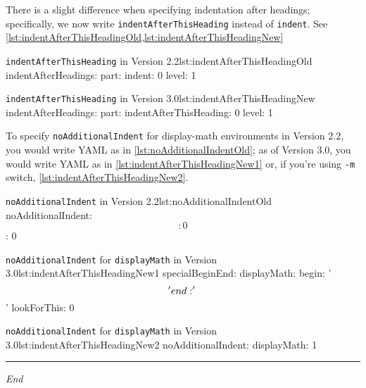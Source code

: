 	 There is a slight difference when specifying indentation after headings; specifically, we now write \texttt{indentAfterThisHeading} instead of \texttt{indent}.
	 See \cref{lst:indentAfterThisHeadingOld,lst:indentAfterThisHeadingNew} 

	 \begin{minipage}{.45\textwidth}
		 \begin{yaml}[style=yaml-LST,numbers=none]{\texttt{indentAfterThisHeading} in Version 2.2}{lst:indentAfterThisHeadingOld}
indentAfterHeadings:
    part:
       indent: 0
       level: 1
\end{yaml}
	 \end{minipage} \hfill
	 \begin{minipage}{.45\textwidth}
		 \begin{yaml}[style=yaml-LST,numbers=none]{\texttt{indentAfterThisHeading} in Version 3.0}{lst:indentAfterThisHeadingNew}
indentAfterHeadings:
    part:
       indentAfterThisHeading: 0
       level: 1
\end{yaml}
	 \end{minipage} 

	 To specify \texttt{noAdditionalIndent} for display-math environments in Version 2.2, you would write YAML as in \cref{lst:noAdditionalIndentOld}; as of Version 3.0, you would write YAML as in \cref{lst:indentAfterThisHeadingNew1} or, if you're using \texttt{-m} switch, \cref{lst:indentAfterThisHeadingNew2}.

	 \begin{minipage}{.45\textwidth}
		 \begin{yaml}[style=yaml-LST,numbers=none]{\texttt{noAdditionalIndent} in Version 2.2}{lst:noAdditionalIndentOld}
noAdditionalIndent:
    \[: 0
    \]: 0
\end{yaml}
	 \end{minipage}%
	 \hfill
	 \begin{minipage}{.45\textwidth}
		 \begin{yaml}[style=yaml-LST,numbers=none]{\texttt{noAdditionalIndent} for \texttt{displayMath} in Version 3.0}{lst:indentAfterThisHeadingNew1}
specialBeginEnd:
    displayMath:
        begin: '\\\['
        end: '\\\]'
        lookForThis: 0
\end{yaml}

		 \begin{yaml}[style=yaml-LST,numbers=none]{\texttt{noAdditionalIndent} for \texttt{displayMath}  in Version 3.0}{lst:indentAfterThisHeadingNew2}
noAdditionalIndent:
    displayMath: 1
\end{yaml}
	 \end{minipage}%

	 \mbox{}\hfill
	 \begin{minipage}{.25\textwidth}
		 \hrule

		 \hfill\itshape End\\\mbox{}\hfill\mbox{}

	 \end{minipage}
